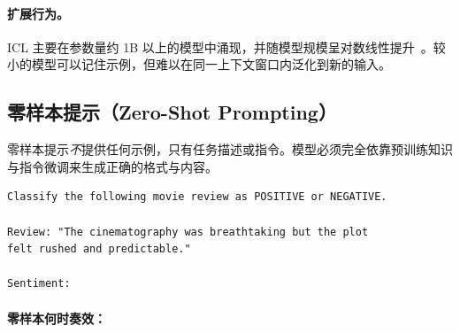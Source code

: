 \paragraph{扩展行为。}
\label{scaling-behaviour.}

ICL 主要在参数量约 1B 以上的模型中涌现，并随模型规模呈对数线性提升~\cite{brown2020language}。较小的模型可以记住示例，但难以在同一上下文窗口内泛化到新的输入。

\subsection{零样本提示（Zero-Shot Prompting）}
\label{zero-shot-prompting}

零样本提示\emph{不}提供任何示例，只有任务描述或指令。模型必须完全依靠预训练知识与指令微调来生成正确的格式与内容。

\begin{examplebox}[零样本分类]
\begin{lstlisting}
Classify the following movie review as POSITIVE or NEGATIVE.

Review: "The cinematography was breathtaking but the plot
felt rushed and predictable."

Sentiment:
\end{lstlisting}
\end{examplebox}

\paragraph{零样本何时奏效：}
\label{when-zero-shot-works-well}

